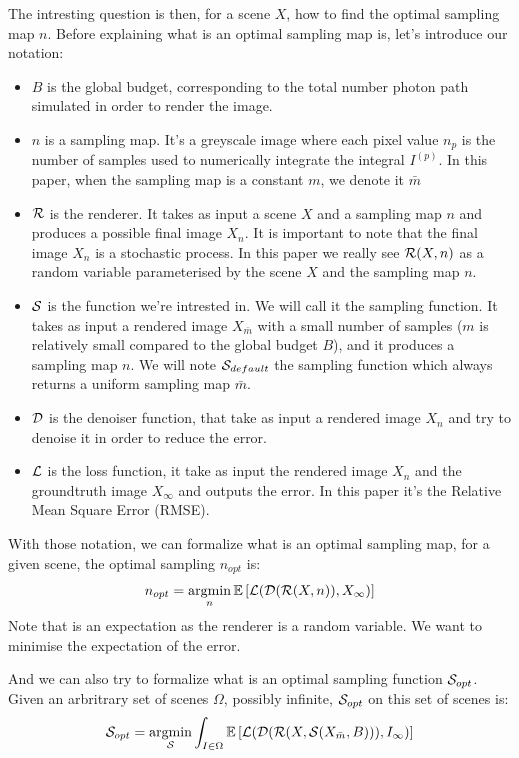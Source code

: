 \documentclass{classeENS}
\begin{document}
\par The intresting question is then, for a scene $X$, how to find the optimal
sampling map $n$. Before explaining what is an optimal sampling map is, let's introduce 
our notation:
\begin{itemize}
    \item $B$ is the global budget, corresponding to the total number photon path simulated
    in order to render the image.
    \item $n$ is a sampling map. It's a greyscale image where each pixel value $n_p$ is the 
    number of samples used to numerically integrate the integral $I^{(p)}$. 
    In this paper, when the sampling map is a constant $m$, we denote it $\bar{m}$
    \item $\mathcal R$ is the renderer. It takes as input a scene $X$ and a sampling map 
    $n$ and produces a possible final image $X_n$. It is important to note that 
    the final image $X_n$ is a stochastic process. In this paper we really see 
    $\mathcal R(X,n)$ as a random variable parameterised by the scene $X$ and the sampling 
    map $n$.
    \item $\mathcal S$ is the function we're intrested in. We will call it the sampling function. 
    It takes as input a rendered image $X_{\bar m}$ with a small number 
    of samples ($m$ is relatively small compared to the global budget $B$), and it 
    produces a sampling map $n$. We will note $\mathcal S_{default}$ the sampling function 
    which always returns a uniform sampling map $\bar m$.
    \item $\mathcal D$ is the denoiser function, that take as input a rendered image $X_n$ and try to
    denoise it in order to reduce the error.
    \item $\mathcal L$ is the loss function, it take as input the rendered image $X_n$ and the groundtruth 
    image $X_\infty$ and outputs the error. In this paper it's the Relative Mean Square Error (RMSE).
\end{itemize}
With those notation, we can formalize what is an optimal sampling map, for a given scene, 
the optimal sampling $n_{opt}$ is:
\begin{equation}
    \label{eq:0}
    n_{opt} = \operatorname*{argmin}_{n} \mathbb E \left [ \mathcal L (\mathcal D (\mathcal R(X, n)), X_\infty) \right ]
\end{equation}
Note that is an expectation as the renderer is a random variable. We want to minimise the 
expectation of the error.

\par And we can also try to formalize what is an optimal sampling function $\mathcal S_{opt}$.
Given an arbritrary set of scenes $\Omega$, possibly infinite, $\mathcal S_{opt}$ on this set of 
scenes is:
\begin{equation}
    \label{eq:1}
    \mathcal S_{opt} = \operatorname*{argmin}_{\mathcal S} \int_{I\in\Omega} \mathbb E \left [ \mathcal L (\mathcal D (\mathcal R(X, \mathcal S(X_{\bar m}, B))), I_\infty) \right ]
\end{equation}
\end{document}
